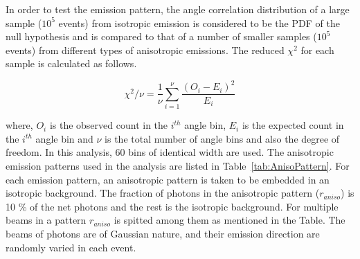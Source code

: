 In order to test the emission pattern, the angle correlation distribution of a large sample ($10^5$ events) 
from isotropic emission is considered to be the PDF of the null hypothesis and is compared 
to that of a number of smaller samples ($10^5$ events) from different types of anisotropic emissions. 
The reduced $\chi^2$ for each sample is calculated as follows.

\begin{equation}
\chi^2/\nu = \frac{1}{\nu} \sum^{\nu}_{i=1} \frac{(O_i - E_i)^2}{E_i}
\label{redchi2}
\end{equation}

where, $O_i$ is the observed count in the $i^{th}$ angle bin, $E_i$ is the expected count in the $i^{th}$ 
angle bin and $\nu$ is the total number of angle bins  and also the degree of freedom. In this analysis, 
60 bins of identical width are used. The anisotropic emission patterns used in the analysis are listed 
in Table~\ref{tab:AnisoPattern}. For each emission pattern,  an anisotropic pattern is taken to be embedded 
in an isotropic background. The fraction of photons in the anisotropic pattern ($r_{aniso}$) is 10 \% of the net photons 
and the rest is the isotropic background. For multiple beams in a pattern $r_{aniso}$ is spitted among them 
as mentioned in the Table. The beams of photons are of Gaussian nature, and their emission direction are 
randomly varied in each event.

